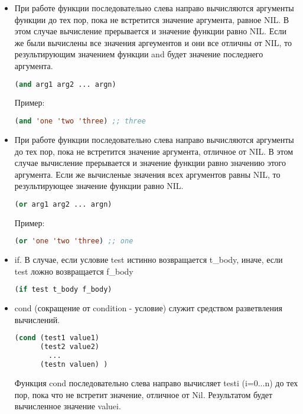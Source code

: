 \documentclass[a4paper,oneside,12pt]{extreport}
\begin{document}
\begin{itemize}
	\item При работе функции 
	последовательно слева направо вычисляются аргументы функции до тех пор, пока не
	встретится значение аргумента, равное NIL. 
	В этом случае вычисление прерывается и значение функции равно NIL. 
	Если же были вычислены все значения аргеументов и
	они все отличны от NIL, то результирующим значением
	функции and будет значение последнего аргумента.
	\begin{lstlisting}[language=Lisp]
(and arg1 arg2 ... argn)
	\end{lstlisting}
	Пример:
	\begin{lstlisting}[language=Lisp]
(and 'one 'two 'three) ;; three 
	\end{lstlisting}
	
	\item При работе функции 
	последовательно слева направо вычисляются аргументы
	до тех пор, пока не встретится значение аргумента, отличное от NIL.
	В этом случае вычисление прерывается и значение функции равно
	значению этого аргумента.
	Если же вычисленые значения всех аргументов равны NIL, 
	то результирующее значение функции
	равно NIL.
	\begin{lstlisting}[language=Lisp]
(or arg1 arg2 ... argn)
	\end{lstlisting}

	Пример:
	\begin{lstlisting}[language=Lisp]
(or 'one 'two 'three) ;; one 
	\end{lstlisting}
	
	\item if.  В случае, если условие test истинно
	возвращается t\_body, иначе, если test ложно
	возвращается f\_body
	
	\begin{lstlisting}[language=Lisp]
(if test t_body f_body)
	\end{lstlisting}
	

	\item cond (сокращение от condition - условие) служит средством
	разветвления вычислений. 
	\begin{lstlisting}[language=Lisp]
(cond (test1 value1)
      (test2 value2)
	    ...
      (testn valuen) )
\end{lstlisting}

	Функция cond последовательно слева направо вычисляет testi (i=0...n) 
	до тех пор, пока что не встретит значение, отличное от Nil. 
	Результатом будет вычисленное значение valuei.  


\end{itemize}
\end{document}
